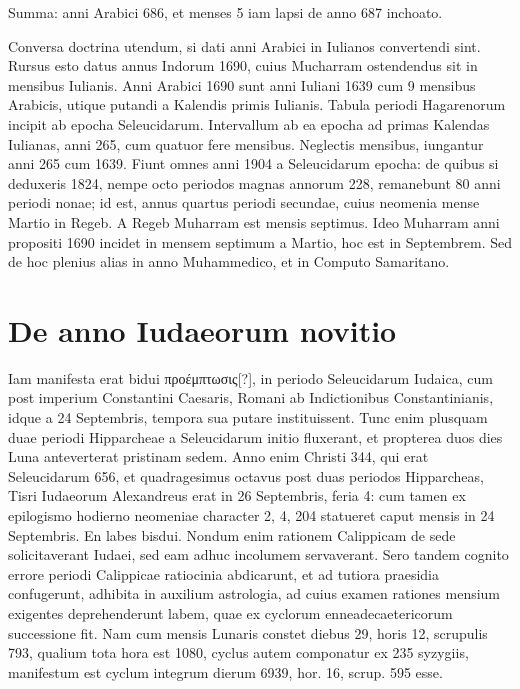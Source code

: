 Summa: anni
Arabici 686, et menses 5 iam lapsi de anno
687 inchoato.
\begin{table}[htbp]
  
\end{table}
Conversa doctrina utendum,
si dati anni Arabici in Iulianos convertendi
sint.
Rursus esto datus annus Indorum
1690, cuius Mucharram ostendendus sit in mensibus
Iulianis.
Anni Arabici 1690 sunt anni
Iuliani 1639 cum 9 mensibus Arabicis, utique
putandi a Kalendis primis Iulianis.
Tabula periodi
Hagarenorum incipit ab epocha Seleucidarum.
Intervallum ab ea epocha ad primas
Kalendas Iulianas, anni 265, cum quatuor fere
mensibus.
Neglectis mensibus, iungantur
anni 265 cum 1639.
Fiunt omnes anni 1904
a Seleucidarum epocha: de quibus si deduxeris
1824, nempe octo periodos magnas annorum
228, remanebunt 80 anni periodi nonae;
id est, annus quartus periodi secundae, cuius neomenia mense Martio
in Regeb.
A Regeb Muharram est mensis septimus.
Ideo Muharram
anni propositi 1690 incidet in mensem septimum a Martio,
hoc est in Septembrem.
Sed de hoc plenius alias in anno Muhammedico,
et in Computo Samaritano.

\section{De anno Iudaeorum novitio}
Iam manifesta erat bidui \textgreek{προέμπτωσις[?]},
 in periodo Seleucidarum Iudaica,
cum post imperium Constantini Caesaris, Romani ab Indictionibus
Constantinianis, idque a 24 Septembris, tempora sua putare
instituissent.
Tunc enim plusquam duae periodi Hipparcheae a Seleucidarum
initio fluxerant, et propterea duos dies Luna anteverterat
pristinam sedem.
Anno enim Christi 344, qui erat Seleucidarum 656,
et quadragesimus octavus post duas periodos Hipparcheas, Tisri Iudaeorum
Alexandreus erat in 26 Septembris, feria 4: cum tamen ex epilogismo
hodierno neomeniae character 2, 4, 204 statueret caput
mensis in 24 Septembris.
En labes bisdui.
Nondum enim rationem Calippicam
de sede solicitaverant Iudaei, sed eam adhuc incolumem servaverant.
Sero tandem cognito errore periodi Calippicae ratiocinia abdicarunt,
et ad tutiora praesidia confugerunt, adhibita in auxilium
astrologia, ad cuius examen rationes mensium exigentes deprehenderunt
labem, quae ex cyclorum enneadecaetericorum successione fit.
Nam cum mensis Lunaris constet diebus 29, horis 12, scrupulis
793, qualium tota hora est 1080, cyclus autem componatur ex 235
syzygiis, manifestum est cyclum integrum dierum 6939, hor. 16, %
scrup. 595 esse. %

